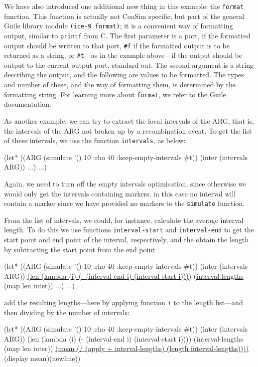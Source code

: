 \documentclass{manual}
\begin{document}
We have also introduced one additional new thing in this example: the
\texttt{format} function.  This function is actually not CoaSim
specific, but part of the general Guile library module \texttt{(ice-9
  format)}; it is a convenient way of formatting output, similar to
\texttt{printf} from C.  The first parameter is a port, if the
formatted output should be written to that port, \texttt{\#f} if the
formatted output is to be returned as a string, or \texttt{\#t}---as
in the example above---if the output should be output to the current
output port, standard out.  The second argument is a string describing
the output, and the following are values to be formatted.  The types
and number of these, and the way of formatting them, is determined by
the formatting string.  For learning more about \texttt{format}, we
refer to the Guile documentation.

As another example, we can try to extract the local intervals of the
ARG, that is, the intervals of the ARG not broken up by a
recombination event.  To get the list of these intervals, we use the
function \texttt{intervals}, as below:
\begin{code}
(let* ((ARG (simulate '() 10 :rho 40 :keep-empty-intervals #t))
       (inter (intervals ARG))
       ...)
    ...)
\end{code}
Again, we need to turn off the empty intervals optimisation, since
otherwise we would only get the intervals containing markers; in this
case no interval will contain a marker since we have provided no
markers to the \texttt{simulate} function.

From the list of intervals, we could, for instance, calculate the
average interval length.  To do this we use functions
\texttt{interval-start} and \texttt{interval-end} to get the start
point and end point of the interval, respectively, and the obtain the
length by subtracting the start point from the end point
\begin{code}
(let* ((ARG (simulate '() 10 :rho 40 :keep-empty-intervals #t))
       (inter (intervals ARG))
       \underline{(len (lambda (i) (- (interval-end i) (interval-start i))))}
       \underline{(interval-lengths (map len inter))}
       ...)
    ...)
\end{code}
add the resulting lengths---here by applying function \texttt{+} to
the length list---and then dividing by the number of intervals:
\begin{code}
(let* ((ARG (simulate '() 10 :rho 40 :keep-empty-intervals #t))
       (inter (intervals ARG))
       (len (lambda (i) (- (interval-end i) (interval-start i))))
       (interval-lengths (map len inter))
       \underline{(mean (/ (apply + interval-lengths) (length interval-lengths))))}
  (display mean)(newline))
\end{code}
\end{document}
